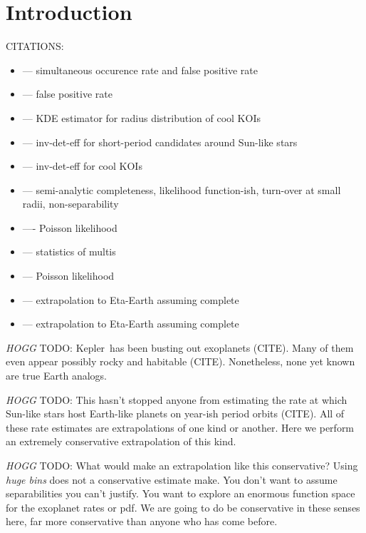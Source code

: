 \documentclass[12pt,preprint]{aastex}
\newcommand{\project}[1]{{\sffamily #1}}
\newcommand{\kepler}{\project{Kepler}}
\newcommand{\todo}[3]{{\color{#2} \emph{#1} TODO: #3}}
\newcommand{\hoggtodo}[1]{\todo{HOGG}{blue}{#1}}
\begin{document}

\section{Introduction}

CITATIONS:
\begin{itemize}
\item
\citet{fressin-fp} --- simultaneous occurence rate and false positive rate
\item
\citet{morton} --- false positive rate
\item
\citet{morton-swift} --- KDE estimator for radius distribution of cool KOIs
\item
\citet{howard} --- inv-det-eff for short-period candidates around Sun-like
stars
\item
\citet{dressing} --- inv-det-eff for cool KOIs
\item
\citet{dong} --- semi-analytic completeness, likelihood function-ish,
turn-over at small radii, non-separability
\item
\citet{tabachnik} ---- Poisson likelihood
\item
\citet{tremaine} --- statistics of multis
\item
\citet{youdin} --- Poisson likelihood
\item
\citet{catanzarite} --- extrapolation to Eta-Earth assuming complete
\item
\citet{traub} --- extrapolation to Eta-Earth assuming complete
\end{itemize}

\hoggtodo{%
\kepler\ has been busting out exoplanets (CITE).
Many of them even appear possibly rocky and habitable (CITE).
Nonetheless, none yet known are true Earth analogs.
}

\hoggtodo{%
This hasn't stopped anyone from estimating the rate at which Sun-like stars
host Earth-like planets on year-ish period orbits (CITE).
All of these rate estimates are extrapolations of one kind or another.
Here we perform an extremely conservative extrapolation of this kind.
}

\hoggtodo{%
What would make an extrapolation like this conservative?
Using \emph{huge bins} does not a conservative estimate make.
You don't want to assume separabilities you can't justify.
You want to explore an enormous function space for the exoplanet rates or pdf.
We are going to do be conservative in these senses here, far more conservative
than anyone who has come before.
}
\end{document}
